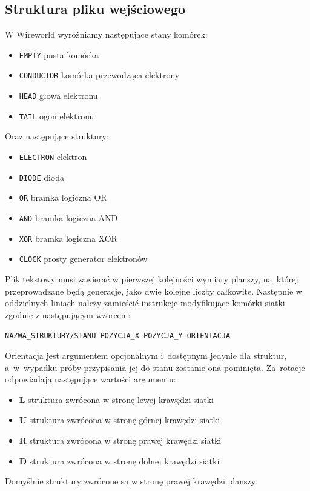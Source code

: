 \documentclass[a4paper,11pt]{article}
\begin{document}
		\subsection{Struktura pliku wejściowego}
			W Wireworld wyróżniamy następujące stany komórek:
			\begin{itemize}
			  \item \texttt{EMPTY} pusta komórka 
			  \item \texttt{CONDUCTOR} komórka przewodząca elektrony
			  \item \texttt{HEAD} głowa elektronu
			  \item \texttt{TAIL} ogon elektronu
			\end{itemize}
			Oraz następujące struktury:
			\begin{itemize}
			  \item \texttt{ELECTRON} elektron 
			  \item \texttt{DIODE} dioda
			  \item \texttt{OR} bramka logiczna OR
			  \item \texttt{AND} bramka logiczna AND
			  \item \texttt{XOR} bramka logiczna XOR
			  \item \texttt{CLOCK} prosty generator elektronów 
			\end{itemize}
			Plik tekstowy musi zawierać w pierwszej kolejności wymiary planszy, na~której przeprowadzane będą generacje, jako dwie kolejne liczby całkowite. Następnie w oddzielnych liniach należy zamieścić instrukcje modyfikujące komórki siatki zgodnie z następującym wzorcem:
			\begin{center}
			\texttt{NAZWA\_STRUKTURY/STANU POZYCJA\_X POZYCJA\_Y ORIENTACJA}
			\end{center}
			Orientacja jest argumentem opcjonalnym i~dostępnym jedynie dla struktur, a~w~wypadku próby przypisania jej do stanu zostanie ona pominięta. Za~rotacje odpowiadają następujące wartości argumentu:
			\begin{itemize}
			  \item \textbf{L} struktura zwrócona w stronę lewej krawędzi siatki
			  \item \textbf{U} struktura zwrócona w stronę górnej krawędzi siatki
			  \item \textbf{R} struktura zwrócona w stronę prawej krawędzi siatki
			  \item \textbf{D} struktura zwrócona w stronę dolnej krawędzi siatki
			\end{itemize}
			Domyślnie struktury zwrócone są w stronę prawej krawędzi planszy. 
\end{document}
